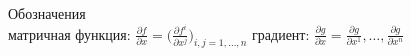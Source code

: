 Обозначения\\

матричная функция: $\frac{\partial f}{\partial x} = \biggl(\frac{\partial f^i}{\partial x^j}\biggr)_{i,j = 1, \dots, n}$
градиент: $\frac{\partial g}{\partial x} = \frac{\partial g}{\partial x^1}, \dots, \frac{\partial g}{\partial x^n}$